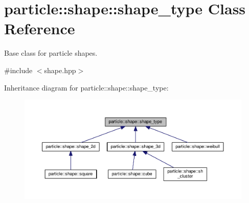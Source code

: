 \hypertarget{classparticle_1_1shape_1_1shape__type}{}\section{particle\+:\+:shape\+:\+:shape\+\_\+type Class Reference}
\label{classparticle_1_1shape_1_1shape__type}


Base class for particle shapes.  




{\ttfamily \#include $<$shape.\+hpp$>$}



Inheritance diagram for particle\+:\+:shape\+:\+:shape\+\_\+type\+:\nopagebreak
\begin{figure}[H]
\begin{center}
\leavevmode
\includegraphics[width=350pt]{d6/d08/classparticle_1_1shape_1_1shape__type__inherit__graph}
\end{center}
\end{figure}

